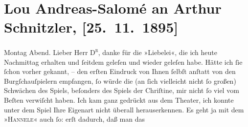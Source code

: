 

         
         \renewcommand{\erwaehntePersonen}{Personen: Richard Beer-Hofmann, Hugo von Hofmannsthal}
         \renewcommand{\erwaehnteOrte}{Orte: Burgtheater, Wien}
         \renewcommand{\erwaehnteWerke}{Werke: Hanneles Himmelfahrt. Traumdichtung in zwei Teilen, Liebelei. Schauspiel in drei Akten}
               \section[Lou Andreas-Salomé an Arthur Schnitzler, {[}25. 11. 1895{]}]{ Lou Andreas-Salomé an Arthur Schnitzler, {[}25. 11. 1895{]}}\nopagebreak{}\rehead{ }\begin{ledgroupsized}[t]{13cm}\normalsize\beginnumbering \toendnotes[C]{\smallbreak\pagebreak[2]} 
\toendnotes[C]{\smallbreak}\pstart
           {\pb}Montag Abend.\pend
           \pstart{}Lieber Herr \textsc{D\textsuperscript{r}},\pend\pstart
           danke für die »Liebelei«, die ich heute Nachmittag
               erhalten und ſeitdem geleſen und wieder geleſen habe. Hätte ich ſie ſchon vorher
               gekannt, – den erſten Eindruck von Ihnen ſelbſt anſtatt von den Burgſchauſpielern empfangen, ſo würde die (an ſich vielleicht
               nicht ſo großen) Schwächen des Spiels, beſonders des Spiels der Chriſtine, mir nicht ſo viel vom Beſten
               verwiſcht haben. Ich kam ganz gedrückt aus dem Theater, ich konnte unter dem Spiel
               Ihre Eigenart nicht überall herauserkennen. Es geht ja mit dem »\textsc{Hannele}« {\pb}auch ſo: erſt dadurch, daß man das

\end{ledgroupsized}
